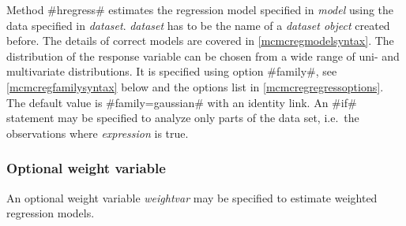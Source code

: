 Method #hregress# estimates the regression model specified in {\em
model} using the data specified in {\em dataset}. {\em dataset}
has to be the name of a {\em dataset object} created before. The
details of correct models are covered in \autoref{mcmcregmodelsyntax}.
The distribution of the response variable can be chosen from a wide
range of uni- and multivariate distributions. It is
specified using option
#family#, see \autoref{mcmcregfamilysyntax} below and the options list in
\autoref{mcmcregregressoptions}. The default value is #family=gaussian#
with an identity link. An #if# statement may be specified to analyze
only parts of the data set, i.e.~the observations where {\em
expression} is true.

\subsubsection{Optional weight variable}
\label{weightspecification}

An optional weight variable {\em weightvar} may be specified to
estimate weighted regression models.


%

